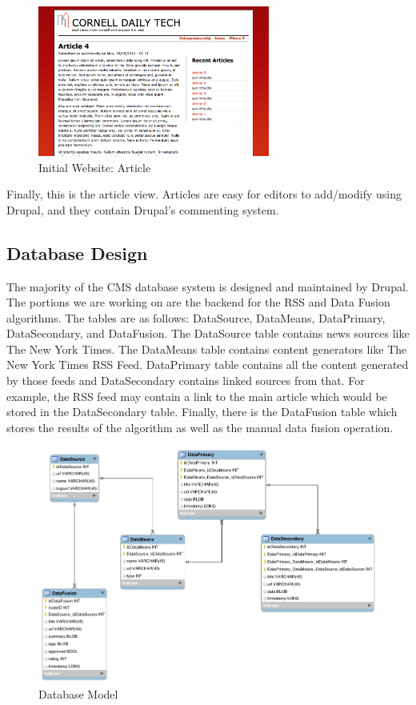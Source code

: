 \documentclass[12pt]{article} %
\begin{document}
\begin{figure}[htbp]
\begin{center}
\includegraphics[width=3in]{images/web-article}
\caption{Initial Website: Article}
\end{center}
\end{figure}
Finally, this is the article view. Articles are easy for editors to add/modify using Drupal, and they contain Drupal’s commenting system.

\subsection{Database Design}

The majority of the CMS database system is designed and maintained by Drupal. The portions we are working on are the backend for the RSS and Data Fusion algorithms. The tables are as follows: DataSource, DataMeans, DataPrimary, DataSecondary, and DataFusion. The DataSource table contains news sources like The New York Times. The DataMeans table contains content generators like The New York Times RSS Feed. DataPrimary table contains all the content generated by those feeds and DataSecondary contains linked sources from that. For example, the RSS feed may contain a link to the main article which would be stored in the DataSecondary table. Finally, there is the DataFusion table which stores the results of the algorithm as well as the manual data fusion operation.

\begin{figure}[htbp]
\begin{center}
\includegraphics[width=6in]{images/database_model}
\caption{Database Model}
\end{center}
\end{figure}
\end{document}
